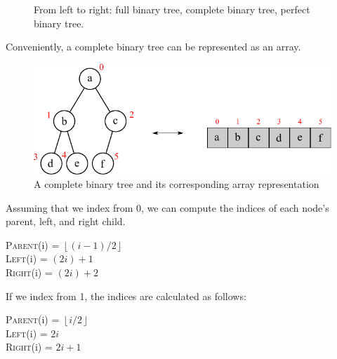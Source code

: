 \begin{figure}[h!]
    \centering
    \hfil
    \vcenteredhbox{
        \begin{tikzpicture}
            \Tree [.{} [.{} {} {} ]
            [.{} {} {} ] ]
        \end{tikzpicture}
    }
    \hfil
    \caption{From left to right: full binary tree, complete binary tree, perfect binary tree.}
\end{figure}

Conveniently, a complete binary tree can be represented as an array.

\begin{figure}[htbp]
    \centering
    \includegraphics[width=0.6\linewidth]{figures/heap_as_arr.pdf}
    \caption{A complete binary tree and its corresponding array representation}
\end{figure}

Assuming that we index from 0, we can compute the indices of each node's parent, left, and right child.

\textsc{Parent}(i) = $\left\lfloor (i-1) / 2 \right\rfloor$ \\
\textsc{Left}(i) = $(2i)+1$ \\
\textsc{Right}(i) = $(2i)+2$

If we index from 1, the indices are calculated as follows:

\textsc{Parent}(i) = $\left\lfloor i / 2 \right\rfloor$ \\
\textsc{Left}(i) = $2i$ \\
\textsc{Right}(i) = $2i+1$

